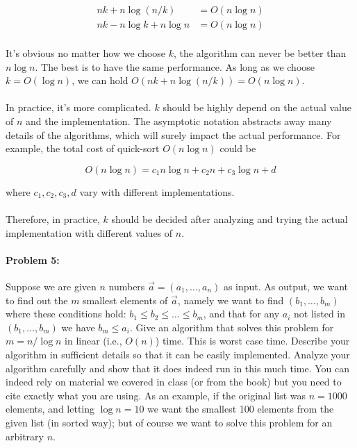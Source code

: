 \documentclass{article}
\begin{document}
$$\begin{aligned}
nk+n\log (n/k)&=O(n\log n)\\
nk-n\log k+n\log n&=O(n\log n)\\
\end{aligned}$$

It's obvious no matter how we choose $k$, the algorithm can never be better than $n\log n$. The best is to have the same performance. As long as we choose $k=O(\log n)$, we can hold $O(nk+n\log (n/k))=O(n\log n)$.

\paragraph{}
In practice, it's more complicated. $k$ should be highly depend on the actual value of $n$ and the implementation. The asymptotic notation abstracts away many details of the algorithms, which will surely impact the actual performance. For example, the total cost of quick-sort $O(n\log n)$ could be

$$
O(n\log n)=c_1n\log n+c_2n+c_3\log n+d
$$

where $c_1, c_2, c_3, d$ vary with different implementations.

\paragraph{}
Therefore, in practice, $k$ should be decided after analyzing and trying the actual implementation with different values of $n$.


\newpage
\paragraph{Problem 5:} 
Suppose we are given $n$ numbers $\vec{a}=(a_1,\dots,a_n)$ as input. As output, we want to find out the $m$ smallest elements of $\vec{a}$, namely we want to find $(b_1,\dots,b_m)$ where these conditions hold:  $b_1\leq b_2 \leq \dots \leq b_m$, and that for any $a_i$ not listed in $(b_1,\dots,b_m)$ we have $b_m \leq a_i.$ Give an algorithm that solves this problem for $m=n / \log n$ in linear (i.e., $O(n)$) time. This is worst case time. Describe your algorithm in sufficient details so that it can be easily implemented. Analyze your algorithm carefully and show that it does indeed run in this much time. You can indeed rely on material we covered in class (or from the book) but you need to cite exactly what you are using. As an example, if the original list was $n=1000$ elements, and letting $\log n = 10$ we want the smallest 100 elements from the given list (in sorted way); but of course we want to solve this problem for an arbitrary $n$.
\end{document}

